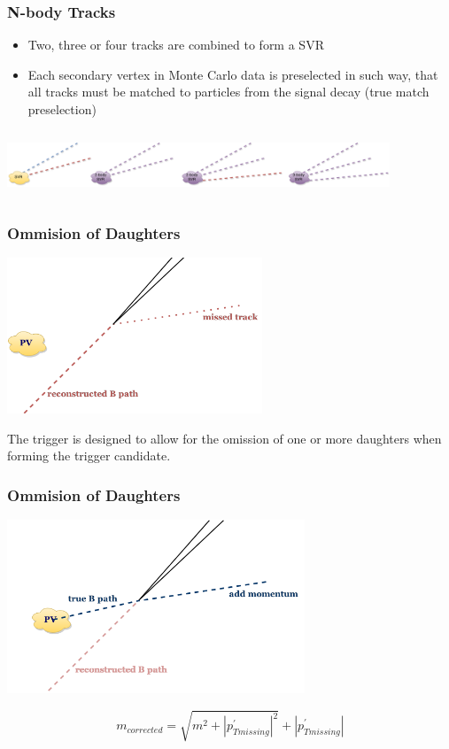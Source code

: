 \documentclass[xcolor=svgnames]{beamer}
\begin{document}
\begin{frame}\frametitle{N-body Tracks}
\begin{itemize}
\item Two, three or four tracks are combined to form a SVR
\item Each secondary vertex in Monte Carlo data is preselected in such way, that all tracks must be matched to particles from the signal decay (true match preselection)
\end{itemize}
\vspace*{1cm}

\includegraphics[width=4.5in, height=0.8in]{images/nbody.png}
\end{frame}

\begin{frame}\frametitle{Ommision of Daughters}
\hspace*{1.5cm}  \includegraphics[width=3in]{images/ommited-2p.png}

\vspace*{0.5cm}

The trigger is designed to allow for the omission of one or more daughters when forming the trigger candidate.
\end{frame}

\begin{frame}\frametitle{Ommision of Daughters}
\hspace*{1cm}  \includegraphics[width=3.5in]{images/ommited-2.png}

$$m_{corrected} = \sqrt{m^2 + \left | p_{Tmissing}^{'}\right |^2} + \left | p_{Tmissing}^{'} \right | $$
\end{frame}
\end{document}
